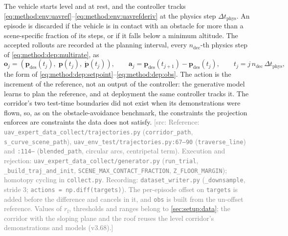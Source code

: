 \documentclass[headsepline,footsepline,footinclude=false,oneside,fontsize=11pt,paper=a4,listof=totoc,bibliography=totoc]{scrbook}
\theoremstyle{definition}
\theoremstyle{plain}
\theoremstyle{remark}
\newcommand{\vect}[1]{\boldsymbol{#1}}
\newcommand{\sidx}[1]{_{\textrm{#1}}}
\newif\ifsubmission
\newcommand{\srcnote}[1]{\ifsubmission\else\textcolor{gray}{\footnotesize\textsf{[src: #1]}}\fi}
\begin{document}
The vehicle starts level and at rest, and the controller tracks
\eqref{eq:method:env:uavref}--\eqref{eq:method:env:uavrefderiv} at the physics step $\Delta t\sidx{phys}$.
An episode is discarded if the vehicle is in contact with an obstacle for more than a scene-specific
fraction of its steps, or if it falls below a minimum altitude. The accepted rollouts are recorded at the
planning interval, every $n\sidx{dec}$-th physics step of \eqref{eq:method:dep:multirate}, as
\begin{equation}\label{eq:method:env:uavdata}
  \vect{o}_{j} = \left(\vect{p}\sidx{des}(t_{j}),\;\vect{p}(t_{j}),\;\dot{\vect{p}}(t_{j})\right),
  \qquad
  \vect{a}_{j} = \vect{p}\sidx{des}(t_{j+1}) - \vect{p}\sidx{des}(t_{j}),
  \qquad
  t_{j} = j\,n\sidx{dec}\,\Delta t\sidx{phys},
\end{equation}
the form of \eqref{eq:method:dep:setpoint}--\eqref{eq:method:dep:obs}. The action is the increment of
the reference, not an output of the controller: the generative model learns to plan the reference,
and at deployment the same controller tracks it. The corridor's two test-time boundaries did not exist
when its demonstrations were flown, so, as on the obstacle-avoidance benchmark, the constraints the
projection enforces are constraints the data does not satisfy.
\srcnote{Reference: \texttt{uav\_expert\_data\_collect/trajectories.py} (\texttt{corridor\_path},
\texttt{s\_curve\_scene\_path}), \texttt{uav\_env\_test/trajectories.py:67--90} (\texttt{traverse\_line})
and \texttt{:114--} (\texttt{blended\_path}, circular arcs, centripetal term). Execution and rejection:
\texttt{uav\_expert\_data\_collect/generator.py} (\texttt{run\_trial}, \texttt{\_build\_traj\_and\_init},
\texttt{SCENE\_MAX\_CONTACT\_FRACTION}, \texttt{Z\_FLOOR\_MARGIN}); homotopy cycling in
\texttt{collect.py}. Recording: \texttt{dataset\_writer.py} (\texttt{\_downsample}, stride 3;
\texttt{actions = np.diff(targets)}). The per-episode offset on \texttt{targets} is added before the
difference and cancels in it, and \texttt{obs} is built from the un-offset reference. Values of
$r\sidx{f}$, thresholds and ranges belong to \autoref{sec:setup:data}; the corridor with the sloping
plane and the roof reuses the level corridor's demonstrations and models (v3.68).}

\end{document}

